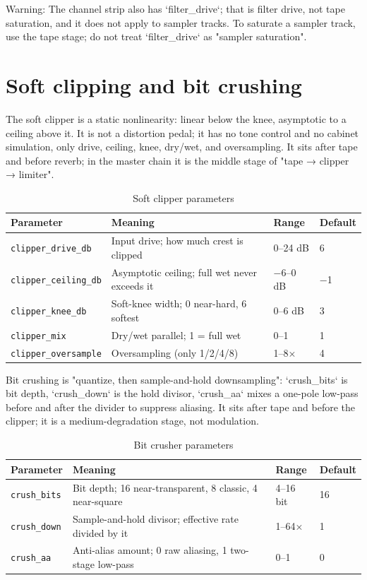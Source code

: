 Warning: The channel strip also has `filter_drive`; that is filter drive, not tape saturation, and it does not apply to sampler tracks. To saturate a sampler track, use the tape stage; do not treat `filter_drive` as "sampler saturation".

\section{Soft clipping and bit crushing}

The soft clipper is a static nonlinearity: linear below the knee, asymptotic to a ceiling above it. It is not a distortion pedal; it has no tone control and no cabinet simulation, only drive, ceiling, knee, dry/wet, and oversampling. It sits after tape and before reverb; in the master chain it is the middle stage of "tape → clipper → limiter".

\begin{table}[htbp]
\centering
\small
\begin{tabular}{@{}llll@{}}
\hline
Parameter & Meaning & Range & Default \\
\hline
\texttt{clipper\_drive\_db} & Input drive; how much crest is clipped & 0–24 dB & 6 \\
\texttt{clipper\_ceiling\_db} & Asymptotic ceiling; full wet never exceeds it & −6–0 dB & −1 \\
\texttt{clipper\_knee\_db} & Soft-knee width; 0 near-hard, 6 softest & 0–6 dB & 3 \\
\texttt{clipper\_mix} & Dry/wet parallel; 1 = full wet & 0–1 & 1 \\
\texttt{clipper\_oversample} & Oversampling (only 1/2/4/8) & 1–8× & 4 \\
\hline
\end{tabular}
\caption{Soft clipper parameters}
\label{tab:clipper-params}
\end{table}

Bit crushing is "quantize, then sample-and-hold downsampling": `crush_bits` is bit depth, `crush_down` is the hold divisor, `crush_aa` mixes a one-pole low-pass before and after the divider to suppress aliasing. It sits after tape and before the clipper; it is a medium-degradation stage, not modulation.

\begin{table}[htbp]
\centering
\small
\begin{tabular}{@{}llll@{}}
\hline
Parameter & Meaning & Range & Default \\
\hline
\texttt{crush\_bits} & Bit depth; 16 near-transparent, 8 classic, 4 near-square & 4–16 bit & 16 \\
\texttt{crush\_down} & Sample-and-hold divisor; effective rate divided by it & 1–64× & 1 \\
\texttt{crush\_aa} & Anti-alias amount; 0 raw aliasing, 1 two-stage low-pass & 0–1 & 0 \\
\hline
\end{tabular}
\caption{Bit crusher parameters}
\label{tab:crusher-params}
\end{table}

